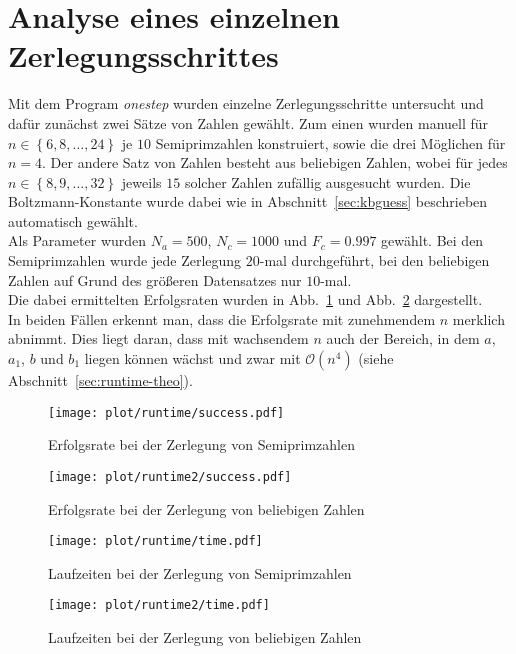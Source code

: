 \section{Analyse eines einzelnen Zerlegungsschrittes}
Mit dem Program \textit{onestep} wurden einzelne Zerlegungsschritte untersucht und dafür zunächst zwei Sätze von Zahlen gewählt. Zum einen wurden manuell für $n\in\left\{6,8,\dots,24\right\}$ je $10$ Semiprimzahlen konstruiert, sowie die drei Möglichen für $n=4$. Der andere Satz von Zahlen besteht aus beliebigen Zahlen, wobei für jedes $n\in\left\{8,9,\dots,32\right\}$ jeweils $15$ solcher Zahlen zufällig ausgesucht wurden. Die Boltzmann-Konstante wurde dabei wie in Abschnitt~\ref{sec:kbguess} beschrieben automatisch gewählt.\\
Als Parameter wurden $N_a=500$, $N_c=1000$ und $F_c=0.997$ gewählt. Bei den Semiprimzahlen wurde jede Zerlegung $20$-mal durchgeführt, bei den beliebigen Zahlen auf Grund des größeren Datensatzes nur $10$-mal. \\
Die dabei ermittelten Erfolgsraten wurden in Abb.~\ref{fig:runtime-success} und Abb.~\ref{fig:runtime2-success} dargestellt. \\
In beiden Fällen erkennt man, dass die Erfolgsrate mit zunehmendem $n$ merklich abnimmt. Dies liegt daran, dass mit wachsendem $n$ auch der Bereich, in dem $a$, $a_1$, $b$ und $b_1$ liegen können wächst und zwar mit $\mathcal{O}\left(n^4\right)$ (siehe Abschnitt~\ref{sec:runtime-theo}).
\begin{figure}[ht]
		\centering
		\texttt{[image: plot/runtime/success.pdf]}
		\caption{Erfolgsrate bei der Zerlegung von Semiprimzahlen}\label{fig:runtime-success}
\end{figure}
\begin{figure}[ht]
		\centering
		\texttt{[image: plot/runtime2/success.pdf]}
		\caption{Erfolgsrate bei der Zerlegung von beliebigen Zahlen}\label{fig:runtime2-success}
\end{figure}
\begin{figure}[ht]
		\centering
		\texttt{[image: plot/runtime/time.pdf]}
		\caption{Laufzeiten bei der Zerlegung von Semiprimzahlen}\label{fig:runtime-runtime}
\end{figure}
\begin{figure}[ht]
		\centering
		\texttt{[image: plot/runtime2/time.pdf]}
		\caption{Laufzeiten bei der Zerlegung von beliebigen Zahlen}\label{fig:runtime2-runtime}
\end{figure}

